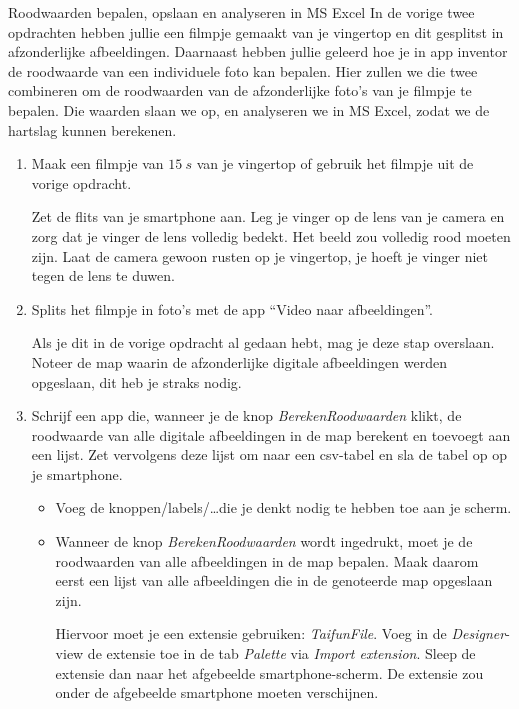 \begin{opdracht}{Roodwaarden bepalen, opslaan en analyseren in MS Excel}
	In de vorige twee opdrachten hebben jullie een filmpje gemaakt van je vingertop en dit gesplitst in afzonderlijke afbeeldingen. Daarnaast hebben jullie geleerd hoe je in app inventor de roodwaarde van een individuele foto kan bepalen. Hier zullen we die twee combineren om de roodwaarden van de afzonderlijke foto's van je filmpje te bepalen. Die waarden slaan we op, en analyseren we in MS Excel, zodat we de hartslag kunnen berekenen.
	
\begin{enumerate}
	\item Maak een filmpje van $15~s$ van je vingertop of gebruik het filmpje uit de vorige opdracht.
	
	Zet de flits van je smartphone aan. Leg je vinger op de lens van je camera en zorg dat je vinger de lens volledig bedekt. Het beeld zou volledig rood moeten zijn. Laat de camera gewoon rusten op je vingertop, je hoeft je vinger niet tegen de lens te duwen.
	
	\item Splits het filmpje in foto's met de app \textquotedblleft Video naar afbeeldingen\textquotedblright.
	
	Als je dit in de vorige opdracht al gedaan hebt, mag je deze stap overslaan. Noteer de map waarin de afzonderlijke digitale afbeeldingen werden opgeslaan, dit heb je straks nodig.
	
	\item Schrijf een app die, wanneer je de knop \emph{BerekenRoodwaarden} klikt, de roodwaarde van alle digitale afbeeldingen in de map berekent en toevoegt aan een lijst. Zet vervolgens deze lijst om naar een csv-tabel en sla de tabel op op je smartphone.

	
		\begin{itemize}
			\item Voeg de knoppen/labels/\ldots die je denkt nodig te hebben toe aan je scherm.
			\item Wanneer de knop \emph{BerekenRoodwaarden} wordt ingedrukt, moet je de roodwaarden van alle afbeeldingen in de map bepalen. Maak daarom eerst een lijst van alle afbeeldingen die in de genoteerde map opgeslaan zijn. 
			
			Hiervoor moet je een extensie gebruiken: \emph{TaifunFile}. Voeg in de \emph{Designer}-view de extensie toe in de tab \emph{Palette} via \emph{Import extension}. Sleep de extensie dan naar het afgebeelde smartphone-scherm. De extensie zou onder de afgebeelde smartphone moeten verschijnen. 
			

\end{itemize}
\end{enumerate}
\end{opdracht}
